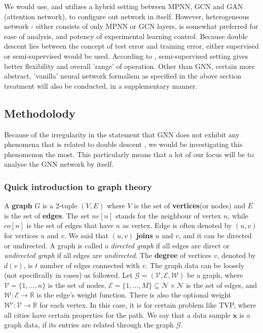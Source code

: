 We would use, and utilizes a hybrid setting between MPNN, GCN and GAN (attention network), to configure out network in itself. However, heterogeneous network - either consists of only MPNN or GCN layers, is somewhat preferred for ease of analysis, and potency of experimental learning control. Because double descent lies between the concept of test error and training error, either supervised or semi-supervised would be used. According to \cite{shi2024homophilymodulatesdoubledescent}, semi-supervised setting gives better flexibility and overall 'range' of operation. Other than GNN, certain more abstract, 'vanilla' neural network formalism as specified in the above section treatment will also be conducted, in a supplementary manner. 

\subsection{Methodolody}

Because of the irregularity in the statement that GNN does not exhibit any phenomena that is related to double descent \cite{shi2024homophilymodulatesdoubledescent}, we would be investigating this phenomenon the most. This particularly means that a lot of our focus will be to analyse the GNN network by itself. 

\subsubsection{Quick introduction to graph theory}

A \textbf{graph} $G$ is a 2-tuple $(V,E)$ where $V$ is the set of \textbf{vertices}(or nodes) and $E$ is the set of \textbf{edges}. The set $ne[n]$ stands for the neighbour of vertex $n$, while $co[n]$ is the set of edges that have $n$ as vertex. Edge is often denoted by $(u,v)$ for vertices $u$ and $v$. We said that $(u,v)$ \textbf{joins} $u$ and $v$, and it can be directed or undirected. A graph is called a \textit{directed graph} if all edges are direct or \textit{undirected graph} if all edges are \textit{undirected}. The \textbf{degree} of vertices $v$, denoted by $d(v)$, is $t$ number of edges connected with $v$.
The graph data can be loosely (not specifically in cases) as followed. Let $\mathcal{G}=(\mathcal{V},\mathcal{E},\mathcal{W})$ be a graph, where $\mathcal{V}=\{1,\dots,n\}$ is the set of nodes, $\mathcal{E}=\{1,\dots,M\}\subseteq \mathcal{N}\times \mathcal{N}$ is the set of edges, and $\mathcal{W}: \mathcal{E}\to \mathbb{R}$ is the edge's weight function. There is also the optional weight $\mathcal{W}': \mathcal{V}\to \mathbb{R}$ for each vertex. In this case, it is for certain problem like TVP, where all cities have certain properties for the path. We say that a data sample $\mathbf{x}$ is a graph data, if its entries are related through the graph $\mathcal{G}$. 

